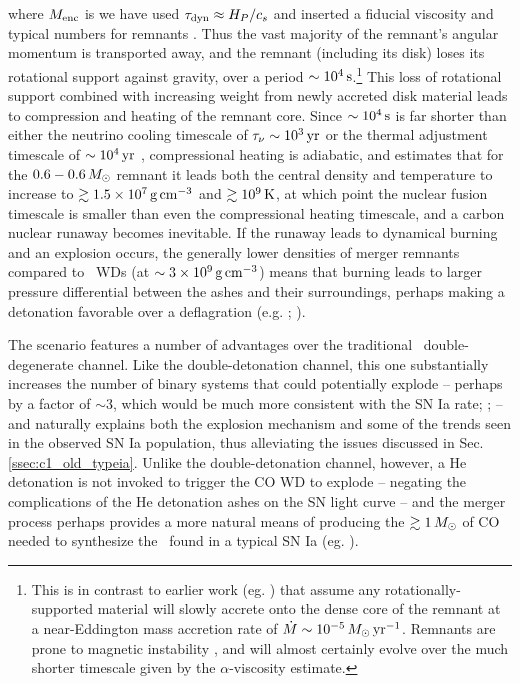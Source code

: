 \noindent where $M_\mathrm{enc}$ is we have used $\taudyn \approx H_P/c_s$ and inserted a fiducial viscosity and typical numbers for remnants \citep{shen+12}.  Thus the vast majority of the remnant's angular momentum is transported away, and the remnant (including its disk) loses its rotational support against gravity, over a period $\sim10^4\,\mathrm{s}$.\footnote{This is in contrast to earlier work (eg. \citep{nomoi85, yoonpr07}) that assume any rotationally-supported material will slowly accrete onto the dense core of the remnant at a near-Eddington mass accretion rate of $\dot{M} \sim 10^{-5}\,\Msun\,\pyr$.  Remnants are prone to magnetic instability \citep{shen+12,ji+13}, and will almost certainly evolve over the much shorter timescale given by the $\alpha$-viscosity estimate.}  This loss of rotational support combined with increasing weight from newly accreted disk material leads to compression and heating of the remnant core.  Since $\sim10^4\,\mathrm{s}$ is far shorter than either the neutrino cooling timescale of $\taunu \sim 10^3\,\mrm{yr}$ or the thermal adjustment timescale of $\sim10^4\,\mathrm{yr}$ \citep{shen+12}, compressional heating is adiabatic, and \citeal{vkercj10} estimates that for the $0.6-0.6\,\Msun$ remnant it leads both the central density and temperature to increase to $\gtrsim1.5\times10^7\,\gcc$ and $\gtrsim10^9\,\mathrm{K}$, at which point the nuclear fusion timescale is smaller than even the compressional heating timescale, and a carbon nuclear runaway becomes inevitable.  If the runaway leads to dynamical burning and an explosion occurs, the generally lower densities of merger remnants compared to \Mch\ WDs (at $\sim3\times10^9\,\gcc$) means that burning leads to larger pressure differential between the ashes and their surroundings, perhaps making a detonation favorable over a deflagration (e.g. \citealt{mazumw77}; \citealt{seit+09}).

The \citeal{vkercj10} scenario features a number of advantages over the traditional \Mch\ double-degenerate channel.  Like the double-detonation channel, this one substantially increases the number of binary systems that could potentially explode -- perhaps by a factor of $\sim3$, which would be much more consistent with the SN Ia rate; \citeal{vkercj10}; \citealt{badem12} -- and naturally explains both the explosion mechanism and some of the trends seen in the observed SN Ia population, thus alleviating the issues discussed in Sec. \ref{ssec:c1_old_typeia}.  Unlike the double-detonation channel, however, a He detonation is not invoked to trigger the CO WD to explode -- negating the complications of the He detonation ashes on the SN light curve -- and the merger process perhaps provides a more natural means of producing the $\gtrsim1\,\Msun$ of CO needed to synthesize the \Ni\ found in a typical SN Ia (eg. \citealt{pirotk14}).

